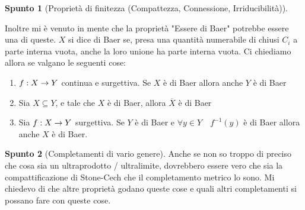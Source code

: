 \documentclass[a4paper,NoNotes,GeneralMath]{stdmdoc}
\theoremstyle{definition}
\newtheorem{spunto}{Spunto}
\begin{document}
\begin{spunto}[Proprietà di finitezza (Compattezza, Connessione, Irriducibilità)]
\begin{enumerate}
		\end{enumerate}
		Inoltre mi è venuto in mente che la proprietà "Essere di Baer" potrebbe essere una di queste. $X$ si dice di Baer se, presa una quantità numerabile di chiusi $C_i$ a parte interna vuota, anche la loro unione ha parte interna vuota. Ci chiediamo allora se valgano le seguenti cose:
		\begin{enumerate}
			\item $f: X \rightarrow Y$ continua e surgettiva. Se $X$ è di Baer allora anche $Y$ è di Baer
			\item Sia $X \subseteq Y$, e tale che $X$ è di Baer, allora $\overline{X}$ è di Baer
			\item Sia $f: X \rightarrow Y$ surgettiva. Se $Y$ è di Baer e $\forall y \in Y \quad f^{-1}(y)$ è di Baer allora anche $X$ è di Baer.
		\end{enumerate}
	\end{spunto}
	
	\begin{spunto}[Completamenti di vario genere]
		Anche se non so troppo di preciso che cosa sia un ultraprodotto / ultralimite, dovrebbero essere vero che sia la compattificazione di Stone-Cech che il completamento metrico lo sono. Mi chiedevo di che altre proprietà godano queste cose e quali altri completamenti si possano fare con queste cose.
	\end{spunto}
	
	
\end{document}
